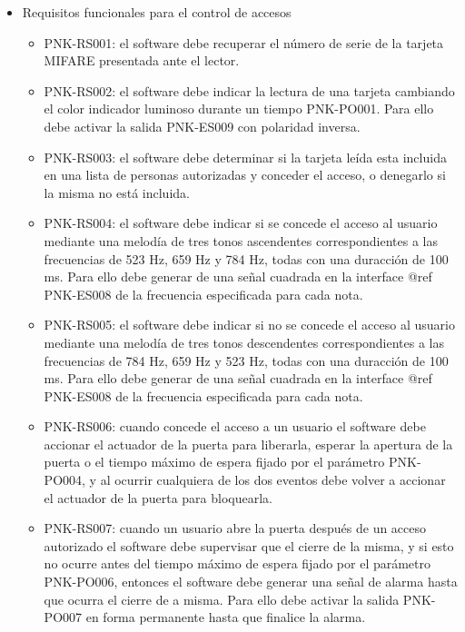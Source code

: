 \begin{itemize}
	\item Requisitos funcionales para el control de accesos
	
	\begin{itemize}
		\item PNK-RS001: el software debe recuperar el número de serie de la tarjeta MIFARE presentada ante el lector.

		\item PNK-RS002: el software debe indicar la lectura de una tarjeta cambiando el color indicador luminoso durante un tiempo PNK-PO001. Para ello debe activar la salida PNK-ES009 con polaridad inversa.

		\item PNK-RS003: el software debe determinar si la tarjeta leída esta incluida en una lista de personas autorizadas y conceder el acceso, o denegarlo si la misma no está incluida.

		\item PNK-RS004: el software debe indicar si se concede el acceso al usuario mediante una melodía de tres tonos ascendentes correspondientes a las frecuencias de 523 Hz, 659 Hz y 784 Hz, todas con una duracción de 100 ms. Para ello debe generar de una señal cuadrada en la interface @ref PNK-ES008 de la frecuencia especificada para cada nota.

		\item PNK-RS005: el software debe indicar si no se concede el acceso al usuario mediante una melodía de tres tonos descendentes correspondientes a las frecuencias de 784 Hz, 659 Hz y 523 Hz, todas con una duracción de 100 ms. Para ello debe generar de una señal cuadrada en la interface @ref PNK-ES008 de la frecuencia especificada para cada nota.

		\item PNK-RS006: cuando concede el acceso a un usuario el software debe accionar el actuador de la puerta para liberarla, esperar la apertura de la puerta o el tiempo máximo de espera fijado por el parámetro PNK-PO004, y al ocurrir cualquiera de los dos eventos debe volver a accionar el actuador de la puerta para bloquearla.

		\item PNK-RS007: cuando un usuario abre la puerta después de un acceso autorizado el software debe supervisar que el cierre de la misma, y si esto no ocurre antes del tiempo máximo de espera fijado por el parámetro PNK-PO006, entonces el software debe generar una señal de alarma hasta que ocurra el cierre de a misma. Para ello debe activar la salida PNK-PO007 en forma permanente hasta que finalice la alarma.


\end{itemize}
\end{itemize}
